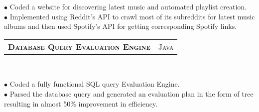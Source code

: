 \documentclass[10pt,letterpaper,oneside]{article}
\begin{document}
    \begin{adjustwidth}{7pt}{0pt}
        {\footnotesize $\bullet$ Coded a website for discovering latest music and automated playlist creation.\\ 
        $\bullet$ Implemented using Reddit's API to crawl most of its subreddits for latest music albums and then used Spotify's API for getting corresponding Spotify links.}\\
    \end{adjustwidth}
    \vspace{-6pt}
    \begin{tabular}{c|c}
        \textbf{\normalsize D\textsc{atabase} Q\textsc{uery}
        E\textsc{valuation} E\textsc{ngine}}
        &\textmd{\normalsize J\textsc{ava}}
    \end{tabular}\\
     \vspace{-4mm}
    \begin{adjustwidth}{7pt}{0pt}
        {\footnotesize $\bullet$ Coded a fully functional SQL query Evaluation Engine.\\
        $\bullet$ Parsed the database query and generated an evaluation plan in the form of tree resulting in almost 50\% improvement in efficiency.}\\
    \end{adjustwidth}
    \begin{comment}
        \vspace{-6pt}
        \begin{tabular}{c|c}
            \textbf{\normalsize S\textsc{impella}}
            &\textmd{\normalsize J\textsc{ava}}
        \end{tabular}\\
         \vspace{-4mm}
        \begin{adjustwidth}{7pt}{0pt}
            {\footnotesize $\bullet$ Implemented a simplified version of the
            Gnutella Protocol Version 0.6, A chatting and file transfer
            system.\\
            $\bullet$ Analyzed important networking concepts like routing tables, table lookup, controlled
            flooding, protocol, packet formatting and distributive
            collaboration.\\
            $\bullet$ Included multitasking capabilities like simultaneous
            downloads and monitoring.}\\
        \end{adjustwidth}
    \end{comment}
\end{document}
